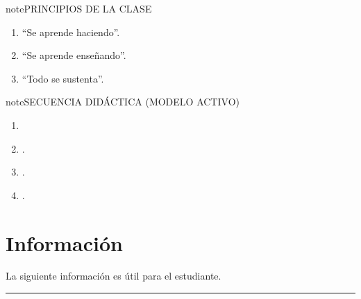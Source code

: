 \documentclass[letterpaper,10pt,spanish]{sphinxmanual}
\begin{document}
\begin{sphinxadmonition}{note}{PRINCIPIOS DE LA CLASE}
\begin{enumerate}
%
\item {} 
\sphinxAtStartPar
“Se aprende haciendo”.

\item {} 
\sphinxAtStartPar
“Se aprende enseñando”.

\item {} 
\sphinxAtStartPar
“Todo se sustenta”.

\end{enumerate}
\end{sphinxadmonition}

\begin{sphinxadmonition}{note}{SECUENCIA DIDÁCTICA (MODELO ACTIVO)}
\begin{enumerate}
%
\item {} 
\sphinxAtStartPar
{}

\item {} 
\sphinxAtStartPar
{}.

\item {} 
\sphinxAtStartPar
{}.

\item {} 
\sphinxAtStartPar
{}.

\end{enumerate}
\end{sphinxadmonition}

\sphinxstepscope


\chapter{Información}
\label{\detokenize{0_intro/informacion:informacion}}\label{\detokenize{0_intro/informacion::doc}}
\sphinxAtStartPar
La siguiente información es útil para el estudiante.


\bigskip\hrule\bigskip
\end{document}
